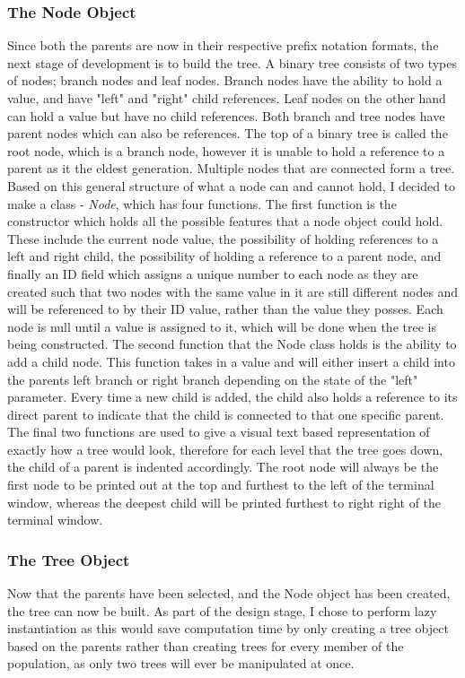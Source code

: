 \documentclass[11pt]{article}
\begin{document}
\subsubsection{The Node Object}
Since both the parents are now in their respective prefix notation formats, the next stage of development is to build the tree. A binary tree consists of two types of nodes; branch nodes and leaf nodes. Branch nodes have the ability to hold a value, and have "left" and "right" child references. Leaf nodes on the other hand can hold a value but have no child references. Both branch and tree nodes have parent nodes which can also be references. The top of a binary tree is called the root node, which is a branch node, however it is unable to hold a reference to a parent as it the eldest generation. Multiple nodes that are connected form a tree. \\
Based on this general structure of what a node can and cannot hold, I decided to make a class - \textit{Node}, which has four functions. The first function is the constructor which holds all the possible features that a node object could hold. These include the current node value, the possibility of holding references to a left and right child, the possibility of holding a reference to a parent node, and finally an ID field which assigns a unique number to each node as they are created such that two nodes with the same value in it are still different nodes and will be referenced to by their ID value, rather than the value they posses. Each node is null until a value is assigned to it, which will be done when the tree is being constructed. The second function that the Node class holds is the ability to add a child node. This function takes in a value and will either insert a child into the parents left branch or right branch depending on the state of the "left" parameter. Every time a new child is added, the child also holds a reference to its direct parent to indicate that the child is connected to that one specific parent. \\
The final two functions are used to give a visual text based representation of exactly how a tree would look, therefore for each level that the tree goes down, the child of a parent is indented accordingly. The root node will always be the first node to be printed out at the top and furthest to the left of the terminal window, whereas the deepest child will be printed furthest to right right of the terminal window. 
\subsubsection{The Tree Object}
Now that the parents have been selected, and the Node object has been created, the tree can now be built. As part of the design stage, I chose to perform lazy instantiation as this would save computation time by only creating a tree object based on the parents rather than creating trees for every member of the population, as only two trees will ever be manipulated at once. 
\end{document}
